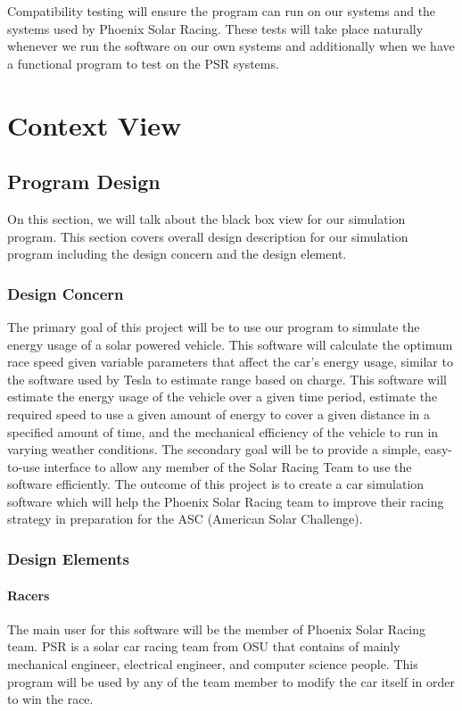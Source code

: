 \documentclass[onecolumn, draftclsnofoot,10pt, compsoc]{IEEEtran}
\begin{document}
Compatibility testing will ensure the program can run on our systems and the systems used by Phoenix Solar Racing. 
These tests will take place naturally whenever we run the software on our own systems and additionally when we have a functional program to test on the PSR systems.

\section{Context View}
\subsection{Program Design}
On this section, we will talk about the black box view for our simulation program.
This section covers overall design description for our simulation program including the design concern and the design element. 
\subsubsection{Design Concern}
The primary goal of this project will be to use our program to simulate the energy usage of a solar powered vehicle.
This software will calculate the optimum race speed given variable parameters that affect the car's energy usage, similar to the software used by Tesla to estimate range based on charge.
This software will estimate the energy usage of the vehicle over a given time period, estimate the required speed to use a given amount of energy to cover a given distance in a specified amount of time, and the mechanical efficiency of the vehicle to run in varying weather conditions. 
The secondary goal will be to provide a simple, easy-to-use interface to allow any member of the Solar Racing Team to use the software efficiently. The outcome of this project is to create a car simulation software which will help the Phoenix Solar Racing team to improve their racing strategy in preparation for the ASC (American Solar Challenge). 

\subsubsection{Design Elements}
\paragraph{Racers}
The main user for this software will be the member of Phoenix Solar Racing team.
PSR is a solar car racing team from OSU that contains of mainly mechanical engineer, electrical engineer, and computer science people. This program will be used by any of the team member to modify the car itself in order to win the race. 
\end{document}

